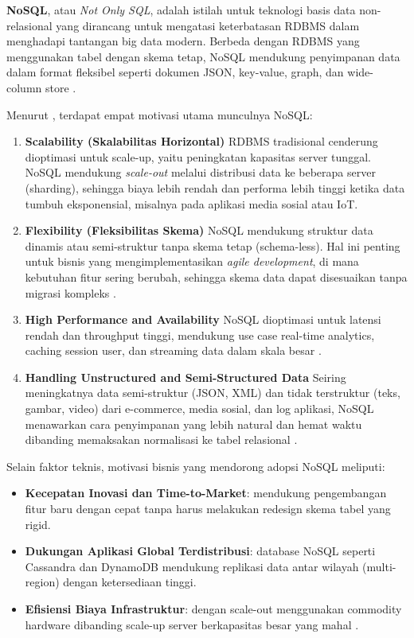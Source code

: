 \textbf{NoSQL}, atau \emph{Not Only SQL}, adalah istilah untuk teknologi basis data non-relasional yang dirancang untuk mengatasi keterbatasan RDBMS dalam menghadapi tantangan big data modern. Berbeda dengan RDBMS yang menggunakan tabel dengan skema tetap, NoSQL mendukung penyimpanan data dalam format fleksibel seperti dokumen JSON, key-value, graph, dan wide-column store \cite{han2011survey, stonebraker2010sql, moniruzzaman2013nosql}.

Menurut \cite{moniruzzaman2013nosql}, terdapat empat motivasi utama munculnya NoSQL:

\begin{enumerate}
	\item \textbf{Scalability (Skalabilitas Horizontal)}  
	RDBMS tradisional cenderung dioptimasi untuk scale-up, yaitu peningkatan kapasitas server tunggal. NoSQL mendukung \emph{scale-out} melalui distribusi data ke beberapa server (sharding), sehingga biaya lebih rendah dan performa lebih tinggi ketika data tumbuh eksponensial, misalnya pada aplikasi media sosial atau IoT.
	
	\item \textbf{Flexibility (Fleksibilitas Skema)}  
	NoSQL mendukung struktur data dinamis atau semi-struktur tanpa skema tetap (schema-less). Hal ini penting untuk bisnis yang mengimplementasikan \emph{agile development}, di mana kebutuhan fitur sering berubah, sehingga skema data dapat disesuaikan tanpa migrasi kompleks \cite{han2011survey}.
	
	\item \textbf{High Performance and Availability}  
	NoSQL dioptimasi untuk latensi rendah dan throughput tinggi, mendukung use case real-time analytics, caching session user, dan streaming data dalam skala besar \cite{gandomi2015, stonebraker2018sql}.
	
	\item \textbf{Handling Unstructured and Semi-Structured Data}  
	Seiring meningkatnya data semi-struktur (JSON, XML) dan tidak terstruktur (teks, gambar, video) dari e-commerce, media sosial, dan log aplikasi, NoSQL menawarkan cara penyimpanan yang lebih natural dan hemat waktu dibanding memaksakan normalisasi ke tabel relasional \cite{han2011survey}.
\end{enumerate}

Selain faktor teknis, motivasi bisnis yang mendorong adopsi NoSQL meliputi:
\begin{itemize}
	\item \textbf{Kecepatan Inovasi dan Time-to-Market}: mendukung pengembangan fitur baru dengan cepat tanpa harus melakukan redesign skema tabel yang rigid.
	\item \textbf{Dukungan Aplikasi Global Terdistribusi}: database NoSQL seperti Cassandra dan DynamoDB mendukung replikasi data antar wilayah (multi-region) dengan ketersediaan tinggi.
	\item \textbf{Efisiensi Biaya Infrastruktur}: dengan scale-out menggunakan commodity hardware dibanding scale-up server berkapasitas besar yang mahal \cite{moniruzzaman2013nosql}.
\end{itemize}

